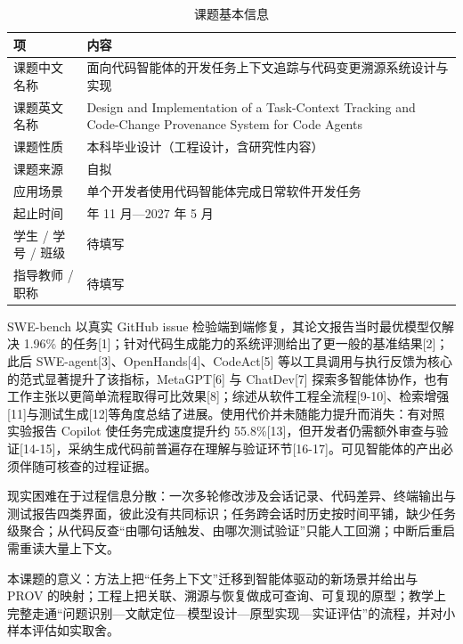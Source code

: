 \begin{table}[H]
  \centering
  \caption{课题基本信息}
  \label{tab:basic-info}
  \begin{tabularx}{\linewidth}{@{}l>{\raggedright\arraybackslash}X@{}}
    \toprule
    项 & 内容 \\
    \midrule
    课题中文名称 & 面向代码智能体的开发任务上下文追踪与代码变更溯源系统设计与实现 \\
    课题英文名称 & Design and Implementation of a Task-Context Tracking and Code-Change Provenance System for Code Agents \\
    课题性质 & 本科毕业设计（工程设计，含研究性内容） \\
    课题来源 & 自拟 \\
    应用场景 & 单个开发者使用代码智能体完成日常软件开发任务 \\
    起止时间 & 2026 年 11 月—2027 年 5 月 \\
    学生 / 学号 / 班级 & 待填写 \\
    指导教师 / 职称 & 待填写 \\
    \bottomrule
  \end{tabularx}
\end{table}

SWE-bench 以真实 GitHub issue 检验端到端修复，其论文报告当时最优模型仅解决 1.96\% 的任务[1]；针对代码生成能力的系统评测给出了更一般的基准结果[2]；此后 SWE-agent[3]、OpenHands[4]、CodeAct[5] 等以工具调用与执行反馈为核心的范式显著提升了该指标，MetaGPT[6] 与 ChatDev[7] 探索多智能体协作，也有工作主张以更简单流程取得可比效果[8]；综述从软件工程全流程[9-10]、检索增强[11]与测试生成[12]等角度总结了进展。使用代价并未随能力提升而消失：有对照实验报告 Copilot 使任务完成速度提升约 55.8\%[13]，但开发者仍需额外审查与验证[14-15]，采纳生成代码前普遍存在理解与验证环节[16-17]。可见智能体的产出必须伴随可核查的过程证据。

现实困难在于过程信息分散：一次多轮修改涉及会话记录、代码差异、终端输出与测试报告四类界面，彼此没有共同标识；任务跨会话时历史按时间平铺，缺少任务级聚合；从代码反查“由哪句话触发、由哪次测试验证”只能人工回溯；中断后重启需重读大量上下文。

本课题的意义：方法上把“任务上下文”迁移到智能体驱动的新场景并给出与 PROV 的映射；工程上把关联、溯源与恢复做成可查询、可复现的原型；教学上完整走通“问题识别—文献定位—模型设计—原型实现—实证评估”的流程，并对小样本评估如实取舍。



